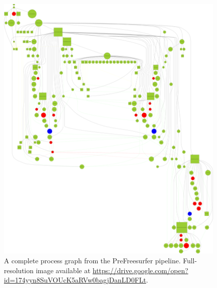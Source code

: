 \documentclass{article}
\begin{document}
\begin{figure}[H]
  \includegraphics[width=\linewidth]{images/graph}
  \caption{A complete process graph from the PreFreesurfer pipeline.
Full-resolution image available at \url{https://drive.google.com/open?id=174yyn8SuVOUcK5aRVw0bagjDanLD0FLt}.}
  \label{fig:complete-graph}
\end{figure}


\end{document}
